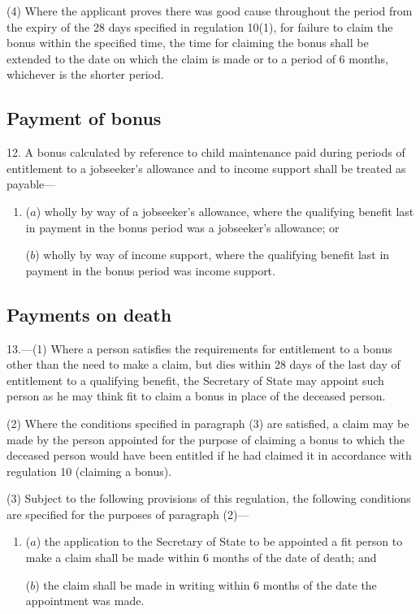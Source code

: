 \documentclass[a4paper]{article}
\begin{document}
(4) Where the applicant proves there was good cause throughout the period from the expiry of the 28 days specified in regulation 10(1), for failure to claim the bonus within the specified time, the time for claiming the bonus shall be extended to the date on which the claim is made or to a period of 6 months, whichever is the shorter period.

\subsection[12. Payment of bonus]{Payment of bonus}

12.  A bonus calculated by reference to child maintenance paid during periods of entitlement to a jobseeker’s allowance and to income support shall be treated as payable—
\begin{enumerate}\item[]
($a$) wholly by way of a jobseeker’s allowance, where the qualifying benefit last in payment in the bonus period was a jobseeker’s allowance; or

($b$) wholly by way of income support, where the qualifying benefit last in payment in the bonus period was income support.
\end{enumerate}

\subsection[13. Payments on death]{Payments on death}

13.—(1) Where a person satisfies the requirements for entitlement to a bonus other than the need to make a claim, but dies within 28 days of the last day of entitlement to a qualifying benefit, the Secretary of State may appoint such person as he may think fit to claim a bonus in place of the deceased person.

(2) Where the conditions specified in paragraph (3) are satisfied, a claim may be made by the person appointed for the purpose of claiming a bonus to which the deceased person would have been entitled if he had claimed it in accordance with regulation 10 (claiming a bonus).

(3) Subject to the following provisions of this regulation, the following conditions are specified for the purposes of paragraph (2)—
\begin{enumerate}\item[]
($a$) the application to the Secretary of State to be appointed a fit person to make a claim shall be made within 6 months of the date of death; and

($b$) the claim shall be made in writing within 6 months of the date the appointment was made.
\end{enumerate}
\end{document}
